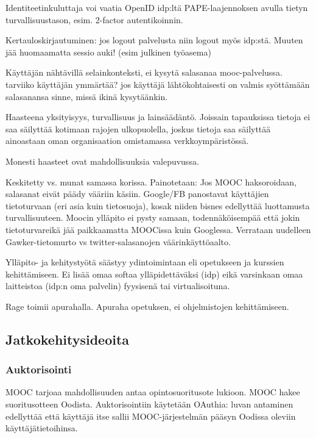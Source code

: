 \documentclass[finnish,gradu]{tktltiki}
\begin{document}
    Identiteetinkuluttaja voi vaatia OpenID idp:ltä PAPE-laajennoksen avulla tietyn turvallisuustason, esim. 2-factor autentikoinnin.

    Kertauloskirjautuminen: jos logout palvelusta niin logout myös idp:stä. Muuten jää huomaamatta sessio auki! (esim julkinen työasema)

    Käyttäjän nähtävillä selainkonteksti, ei kysytä salasanaa mooc-palvelussa. tarviiko käyttäjän ymmärtää? jos käyttäjä lähtökohtaisesti on valmis syöttämään salasanansa sinne, missä ikinä kysytäänkin.

    Haasteena yksityisyys, turvallisuus ja lainsäädäntö. Joissain tapauksissa tietoja ei saa säilyttää kotimaan rajojen ulkopuolella, joskus tietoja saa säilyttää ainoastaan oman organisaation omistamassa verkkoympäristössä.

    Monesti haasteet ovat mahdollisuuksia valepuvussa.

    Keskitetty vs. munat samassa korissa. Painotetaan: Jos MOOC haksoroidaan, salasanat eivät päädy vääriin käsiin. Google/FB panostavat käyttäjien tietoturvaan (eri asia kuin tietosuoja), kosak niiden bisnes edellyttää luottamusta turvallisuuteen. Moocin ylläpito ei pysty samaan, todennäköisempää että jokin tietoturvareikä jää paikkaamatta MOOCissa kuin Googlessa. Verrataan uudelleen Gawker-tietomurto vs twitter-salasanojen väärinkäyttöaalto.

    Ylläpito- ja kehitystyötä säästyy ydintoimintaan eli opetukseen ja kurssien kehittämiseen. Ei lisää omaa softaa ylläpidettäväksi (idp) eikä varsinkaan omaa laitteistoa (idp:n oma palvelin) fyysisenä tai virtualisoituna.

    Rage toimii apurahalla. Apuraha opetuksen, ei ohjelmistojen kehittämiseen.

  \subsection{Jatkokehitysideoita} %
  \label{sub:jatkokehitysideoita}

  \subsubsection{Auktorisointi} %
  \label{ssub:jatkokehitysideoita_auktorisointi}
  MOOC tarjoaa mahdollisuuden antaa opintosuoritusote lukioon. MOOC hakee suoritusotteen Oodista. Auktorisointiin käytetään OAuthia: luvan antaminen edellyttää että käyttäjä itse sallii MOOC-järjestelmän pääsyn Oodissa oleviin käyttäjätietoihinsa.
\end{document}
